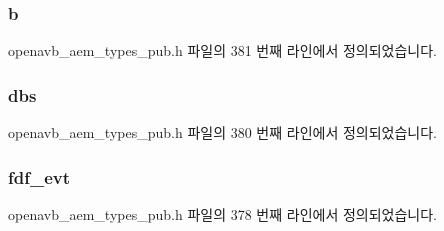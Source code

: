 \subsubsection[{\texorpdfstring{b}{b}}]{ b}\hypertarget{structopenavb__aem__stream__format__iec__61883__6__32bit__t_a8921ab436782828cd4262390e8b01eb7}{}\label{structopenavb__aem__stream__format__iec__61883__6__32bit__t_a8921ab436782828cd4262390e8b01eb7}


openavb\+\_\+aem\+\_\+types\+\_\+pub.\+h 파일의 381 번째 라인에서 정의되었습니다.

\subsubsection[{\texorpdfstring{dbs}{dbs}}]{ dbs}\hypertarget{structopenavb__aem__stream__format__iec__61883__6__32bit__t_abed3ffe3c3261fb920ef333f76a290bd}{}\label{structopenavb__aem__stream__format__iec__61883__6__32bit__t_abed3ffe3c3261fb920ef333f76a290bd}


openavb\+\_\+aem\+\_\+types\+\_\+pub.\+h 파일의 380 번째 라인에서 정의되었습니다.

\subsubsection[{\texorpdfstring{fdf\+\_\+evt}{fdf_evt}}]{ fdf\+\_\+evt}\hypertarget{structopenavb__aem__stream__format__iec__61883__6__32bit__t_a5face0fe6e253b8041386eaa28f73800}{}\label{structopenavb__aem__stream__format__iec__61883__6__32bit__t_a5face0fe6e253b8041386eaa28f73800}


openavb\+\_\+aem\+\_\+types\+\_\+pub.\+h 파일의 378 번째 라인에서 정의되었습니다.

